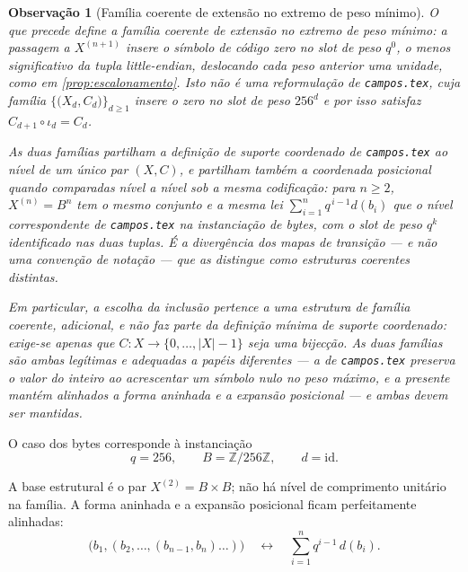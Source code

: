 \documentclass[11pt,a4paper]{article}
\newtheorem{observacao}{Observação}
\begin{document}
\begin{observacao}[Família coerente de extensão no extremo de peso mínimo]
\label{obs:extensao-pesomin}
O que precede define a \emph{família coerente de extensão no extremo de peso
mínimo}: a passagem a \(X^{(n+1)}\) insere o símbolo de código zero no slot de
peso \(q^0\), o menos significativo da tupla little-endian, deslocando cada peso
anterior uma unidade, como em \ref{prop:escalonamento}. Isto não é uma
reformulação de \texttt{campos.tex}, cuja família
\(\bigl\{\bigl(X_d,C_d\bigr)\bigr\}_{d\ge1}\) insere o zero no slot de peso
\(256^d\) e por isso satisfaz \(C_{d+1}\circ\iota_d=C_d\).

As duas famílias partilham a definição de suporte coordenado de
\texttt{campos.tex} ao nível de um único par \((X,C)\), e partilham também a
coordenada posicional quando comparadas nível a nível sob a mesma codificação:
para \(n\ge2\), \(X^{(n)}=B^n\) tem o mesmo conjunto e a mesma lei
\(\sum_{i=1}^{n}q^{\,i-1}d(b_i)\) que o nível correspondente de
\texttt{campos.tex} na instanciação de bytes, com o slot de peso \(q^{k}\)
identificado nas duas tuplas. É a divergência dos mapas de transição --- e não
uma convenção de notação --- que as distingue como estruturas coerentes
distintas.

Em particular, a escolha da inclusão pertence a uma estrutura de família
coerente, adicional, e não faz parte da definição mínima de suporte
coordenado: exige-se apenas que
\(C\colon X\to\{0,\dots,\lvert X\rvert-1\}\) seja uma bijecção. As duas famílias
são ambas legítimas e adequadas a papéis diferentes --- a de \texttt{campos.tex}
preserva o valor do inteiro ao acrescentar um símbolo nulo no peso máximo, e a
presente mantém alinhados a forma aninhada e a expansão posicional --- e ambas
devem ser mantidas.
\end{observacao}

O caso dos bytes corresponde à instanciação
\[
q=256,
\qquad
B=\mathbb Z/256\mathbb Z,
\qquad
d=\mathrm{id}.
\]

A base estrutural é o par \(X^{(2)}=B\times B\); não há nível de comprimento unitário na família.
A forma aninhada e a expansão posicional ficam perfeitamente alinhadas:
\[
\bigl(b_1,(b_2,\dots,(b_{n-1},b_n)\dots)\bigr)
\quad\longleftrightarrow\quad
\sum_{i=1}^{n} q^{i-1}\,d(b_i).
\]
\end{document}

